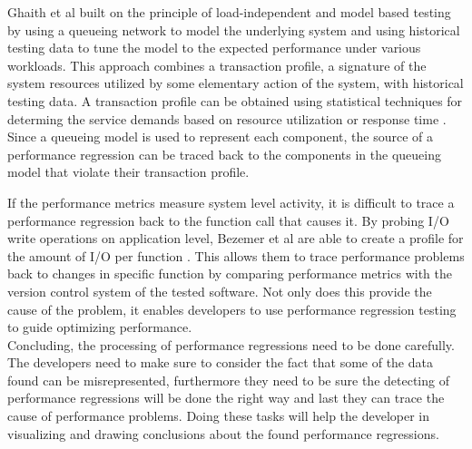 Ghaith et al built on the principle of load-independent and model based testing by using a queueing network to model the underlying system and using historical testing data to tune the model to the expected performance under various workloads. \cite{ghaith2013profile} This approach combines a transaction profile, a signature of the system resources utilized by some elementary action of the system, with historical testing data. A transaction profile can be obtained using statistical techniques for determing the service demands based on resource utilization \cite{casale2008robust} or response time \cite{kraft2009estimating}. Since a queueing model is used to represent each component, the source of a performance regression can be traced back to the components in the queueing model that violate their transaction profile.

If the performance metrics measure system level activity, it is difficult to trace a performance regression back to the function call that causes it. By probing I/O write operations on application level, Bezemer et al are able to create a profile for the amount of I/O per function \cite{bezemer2014detecting}. This allows them to trace performance problems back to changes in specific function by comparing performance metrics with the version control system of the tested software. Not only does this provide the cause of the problem, it enables developers to use performance regression testing to guide optimizing performance. \\

Concluding, the processing of performance regressions need to be done carefully. The developers need to make sure to consider the fact that some of the data found can be misrepresented, furthermore they need to be sure the detecting of performance regressions will be done the right way and last they can trace the cause of performance problems. Doing these tasks will help the developer in visualizing and drawing conclusions about the found performance regressions.


